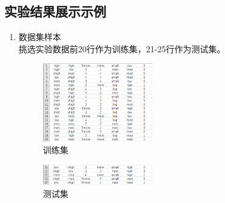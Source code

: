 \documentclass[UTF8,a4paper,12pt]{article}
\begin{document}
\subsection{实验结果展示示例}
\begin{enumerate}[itemindent=0.5em,label=\arabic*、]
  \item 数据集样本\\
  挑选实验数据前20行作为训练集，21-25行作为测试集。
  \begin{figure}[h]
  \begin{center}
  \includegraphics[width=0.45\textwidth]{p8.png}
  \caption{训练集}
  \end{center}
  \end{figure}

  \begin{figure}[h]
  \begin{center}
  \includegraphics[width=0.45\textwidth]{p9.png}
  \caption{测试集}
  \end{center}
  \end{figure}


\end{enumerate}
\end{document}
